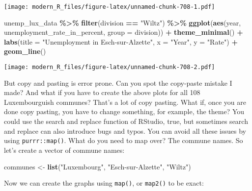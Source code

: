 \documentclass[
]{article}
\newenvironment{Shaded}{\begin{snugshade}}{\end{snugshade}}
\newcommand{\DataTypeTok}[1]{\textcolor[rgb]{0.13,0.29,0.53}{#1}}
\newcommand{\KeywordTok}[1]{\textcolor[rgb]{0.13,0.29,0.53}{\textbf{#1}}}
\newcommand{\NormalTok}[1]{#1}
\newcommand{\OperatorTok}[1]{\textcolor[rgb]{0.81,0.36,0.00}{\textbf{#1}}}
\newcommand{\StringTok}[1]{\textcolor[rgb]{0.31,0.60,0.02}{#1}}
\begin{document}
\texttt{[image: modern\_R\_files/figure-latex/unnamed-chunk-708-1.pdf]}

\begin{Shaded}
\begin{Highlighting}[]
\NormalTok{unemp\_lux\_data }\OperatorTok{\%\textgreater{}\%}
\StringTok{  }\KeywordTok{filter}\NormalTok{(division }\OperatorTok{==}\StringTok{ "Wiltz"}\NormalTok{) }\OperatorTok{\%\textgreater{}\%}
\StringTok{  }\KeywordTok{ggplot}\NormalTok{(}\KeywordTok{aes}\NormalTok{(year, unemployment\_rate\_in\_percent, }\DataTypeTok{group =}\NormalTok{ division)) }\OperatorTok{+}
\StringTok{  }\KeywordTok{theme\_minimal}\NormalTok{() }\OperatorTok{+}
\StringTok{  }\KeywordTok{labs}\NormalTok{(}\DataTypeTok{title =} \StringTok{"Unemployment in Esch{-}sur{-}Alzette"}\NormalTok{, }\DataTypeTok{x =} \StringTok{"Year"}\NormalTok{, }\DataTypeTok{y =} \StringTok{"Rate"}\NormalTok{) }\OperatorTok{+}
\StringTok{  }\KeywordTok{geom\_line}\NormalTok{()}
\end{Highlighting}
\end{Shaded}

\texttt{[image: modern\_R\_files/figure-latex/unnamed-chunk-708-2.pdf]}

But copy and pasting is error prone. Can you spot the copy-paste mistake I made? And what if you
have to create the above plots for all 108 Luxembourguish communes? That's a lot of copy pasting.
What if, once you are done copy pasting, you have to change something, for example, the theme? You
could use the search and replace function of RStudio, true, but sometimes search and replace can
also introduce bugs and typos. You can avoid all these issues by using \texttt{purrr::map()}. What do you
need to map over? The commune names. So let's create a vector of commune names:

\begin{Shaded}
\begin{Highlighting}[]
\NormalTok{communes \textless{}{-}}\StringTok{ }\KeywordTok{list}\NormalTok{(}\StringTok{"Luxembourg"}\NormalTok{, }\StringTok{"Esch{-}sur{-}Alzette"}\NormalTok{, }\StringTok{"Wiltz"}\NormalTok{)}
\end{Highlighting}
\end{Shaded}

Now we can create the graphs using \texttt{map()}, or \texttt{map2()} to be exact:
\end{document}
